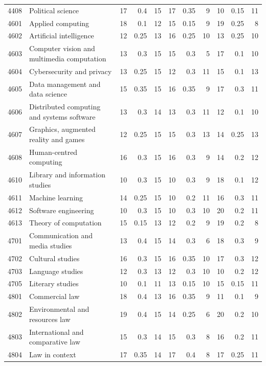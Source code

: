 \begin{longtable}{r p{2.15cm} rrr rrr rrr}
4408 & Political science & 17 & 0.4 & 15 & 17 & 0.35 & 9 & 10 & 0.15 & 11 \\
4601 & Applied computing & 18 & 0.1 & 12 & 15 & 0.15 & 9 & 19 & 0.25 & 8 \\
4602 & Artificial intelligence & 12 & 0.25 & 13 & 16 & 0.25 & 10 & 13 & 0.25 & 10 \\
4603 & Computer vision and multimedia computation & 13 & 0.3 & 15 & 15 & 0.3 & 5 & 17 & 0.1 & 10 \\
4604 & Cybersecurity and privacy & 13 & 0.25 & 15 & 12 & 0.3 & 11 & 15 & 0.1 & 13 \\
4605 & Data management and data science & 15 & 0.35 & 15 & 16 & 0.35 & 9 & 17 & 0.3 & 11 \\
4606 & Distributed computing and systems software & 13 & 0.3 & 14 & 13 & 0.3 & 11 & 12 & 0.1 & 10 \\
4607 & Graphics, augmented reality and games & 12 & 0.25 & 15 & 15 & 0.3 & 13 & 14 & 0.25 & 13 \\
4608 & Human-centred computing & 16 & 0.3 & 15 & 16 & 0.3 & 9 & 14 & 0.2 & 12 \\
4610 & Library and information studies & 10 & 0.3 & 15 & 10 & 0.3 & 9 & 18 & 0.1 & 12 \\
4611 & Machine learning & 14 & 0.25 & 15 & 10 & 0.2 & 11 & 16 & 0.3 & 11 \\
4612 & Software engineering & 10 & 0.3 & 15 & 10 & 0.3 & 10 & 20 & 0.2 & 11 \\
4613 & Theory of computation & 15 & 0.15 & 13 & 12 & 0.2 & 9 & 19 & 0.2 & 8 \\
4701 & Communication and media studies & 13 & 0.4 & 15 & 14 & 0.3 & 6 & 18 & 0.3 & 9 \\
4702 & Cultural studies & 16 & 0.3 & 15 & 16 & 0.35 & 10 & 17 & 0.3 & 12 \\
4703 & Language studies & 12 & 0.3 & 13 & 12 & 0.3 & 10 & 10 & 0.2 & 12 \\
4705 & Literary studies & 10 & 0.1 & 11 & 13 & 0.15 & 10 & 15 & 0.15 & 11 \\
4801 & Commercial law & 18 & 0.4 & 13 & 16 & 0.35 & 9 & 11 & 0.1 & 9 \\
4802 & Environmental and resources law & 19 & 0.4 & 15 & 14 & 0.25 & 6 & 20 & 0.2 & 10 \\
4803 & International and comparative law & 15 & 0.3 & 14 & 15 & 0.3 & 8 & 16 & 0.2 & 11 \\
4804 & Law in context & 17 & 0.35 & 14 & 17 & 0.4 & 8 & 17 & 0.25 & 11 \\

\end{longtable}
